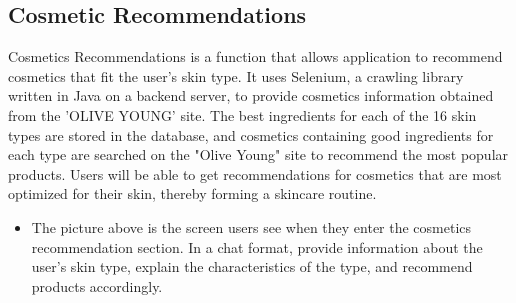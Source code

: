 \documentclass[conference]{IEEEtran}
\begin{document}
\subsection{Cosmetic Recommendations}
Cosmetics Recommendations is a function that allows application to recommend cosmetics that fit the user's skin type. It uses Selenium, a crawling library written in Java on a backend server, to provide cosmetics information obtained from the 'OLIVE YOUNG' site. The best ingredients for each of the 16 skin types are stored in the database, and cosmetics containing good ingredients for each type are searched on the "Olive Young" site to recommend the most popular products. Users will be able to get recommendations for cosmetics that are most optimized for their skin, thereby forming a skincare routine. 
\begin{itemize}
    \begin{figure}[h]
    \centering
    \texttt{[image: fig/HISKIN\_231120-13.jpg]}
    \label{fig:Cosmetic Recommendations Page}
    \caption{Cosmetic Recommendations Page} 
    \end{figure}
    \item[]The picture above is the screen users see when they enter the cosmetics recommendation section. In a chat format, provide information about the user's skin type, explain the characteristics of the type, and recommend products accordingly.
\end{itemize}
\end{document}
